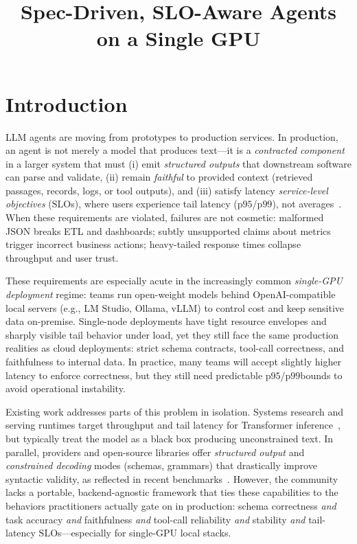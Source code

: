 \documentclass[11pt]{article}
\title{Spec-Driven, SLO-Aware Agents on a Single GPU}
\date{}
\newcommand{\pninetyfive}{\ensuremath{\mathrm{p95}}}
\newcommand{\pninetynine}{\ensuremath{\mathrm{p99}}}
\newcommand{\slo}{\ensuremath{\mathrm{SLO}}}
\begin{document}
\maketitle

\usepackage{tikz}
\usetikzlibrary{arrows.meta, positioning, shapes.geometric, calc}

\section{Introduction}

LLM agents are moving from prototypes to production services.
In production, an agent is not merely a model that produces text---it is a \emph{contracted component} in a larger system that must (i) emit \emph{structured outputs} that downstream software can parse and validate, (ii) remain \emph{faithful} to provided context (retrieved passages, records, logs, or tool outputs), and (iii) satisfy latency \emph{service-level objectives} (\slo s), where users experience tail latency (\pninetyfive/\pninetynine), not averages~\citep{dean2013tail}.
When these requirements are violated, failures are not cosmetic: malformed JSON breaks ETL and dashboards; subtly unsupported claims about metrics trigger incorrect business actions; heavy-tailed response times collapse throughput and user trust.

These requirements are especially acute in the increasingly common \emph{single-GPU deployment} regime:
teams run open-weight models behind OpenAI-compatible local servers (e.g., LM Studio, Ollama, vLLM) to control cost and keep sensitive data on-premise.
Single-node deployments have tight resource envelopes and sharply visible tail behavior under load, yet they still face the same production realities as cloud deployments: strict schema contracts, tool-call correctness, and faithfulness to internal data.
In practice, many teams will accept slightly higher latency to enforce correctness, but they still need predictable \pninetyfive/\pninetynine bounds to avoid operational instability.

Existing work addresses parts of this problem in isolation.
Systems research and serving runtimes target throughput and tail latency for Transformer inference~\citep{kwon2023vllm,zheng2023sglang,deepspeedFastGen,agrawal2024sarathi}, but typically treat the model as a black box producing unconstrained text.
In parallel, providers and open-source libraries offer \emph{structured output} and \emph{constrained decoding} modes (schemas, grammars) that drastically improve syntactic validity, as reflected in recent benchmarks~\citep{geng2025jsonschemabench,letmespeakfreely,structuredRAG}.
However, the community lacks a portable, backend-agnostic framework that ties these capabilities to the behaviors practitioners actually gate on in production:
schema correctness \emph{and} task accuracy \emph{and} faithfulness \emph{and} tool-call reliability \emph{and} stability \emph{and} tail-latency \slo s---especially for single-GPU local stacks.
\end{document}
